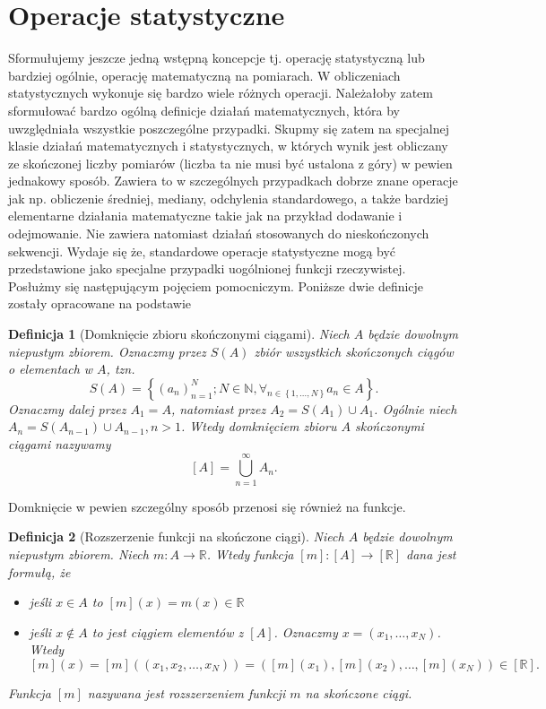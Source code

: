 \documentclass[12pt,a4paper]{report}
\newtheorem{definition}{Definicja}[chapter]
\newcommand{\zbior}[1]{\left\lbrace {#1} \right\rbrace }
\newcommand{\domkniecie}[1]{\left[ {#1} \right] }
\begin{document}
\section{Operacje statystyczne}
 Sformułujemy jeszcze jedną wstępną koncepcje tj. operację statystyczną lub bardziej ogólnie, operację matematyczną na pomiarach. W obliczeniach statystycznych wykonuje się bardzo wiele różnych operacji. Należałoby zatem sformułować bardzo ogólną definicje działań matematycznych, która by uwzględniała wszystkie poszczególne przypadki. Skupmy się zatem na specjalnej klasie działań matematycznych i statystycznych, w których wynik jest obliczany ze skończonej liczby pomiarów (liczba ta nie musi być ustalona z góry) w pewien jednakowy sposób. Zawiera to w szczególnych przypadkach dobrze znane operacje jak np. obliczenie średniej, mediany, odchylenia standardowego, a także bardziej elementarne działania matematyczne takie jak na przykład dodawanie i odejmowanie. Nie zawiera natomiast działań stosowanych do nieskończonych sekwencji. Wydaje się że, standardowe operacje statystyczne mogą być przedstawione jako specjalne przypadki uogólnionej funkcji rzeczywistej. Posłużmy się następującym pojęciem pomocniczym. 
Poniższe dwie definicje zostały opracowane na podstawie {\cite[Sec. 4]{adams1965theory}}
\begin{definition}[Domknięcie zbioru skończonymi ciągami]
Niech $A$ będzie dowolnym niepustym zbiorem. Oznaczmy przez $S(A)$ zbiór wszystkich skończonych ciągów o elementach w $A$, tzn.
$$
S(A)=\zbior{(a_n)^{N}_{n=1}; N\in \mathbb{N}, \forall_{n\in \zbior{1,\dots,N}} a_n \in A}.
$$
Oznaczmy dalej przez $A_1 =A$, natomiast przez $A_2 = S(A_1) \cup A_1$. Ogólnie niech $A_n = S(A_{n-1})\cup A_{n-1}, n>1$. Wtedy domknięciem zbioru $A$ skończonymi ciągami nazywamy
$$
\domkniecie{A}=\bigcup^{\infty}_{n=1} A_n.
$$ 
\end{definition}
Domknięcie w pewien szczególny sposób przenosi się również na funkcje.
\begin{definition}[Rozszerzenie funkcji na skończone ciągi]
Niech $A$ będzie dowolnym niepustym zbiorem. Niech $m:A\to \mathbb{R}$. Wtedy funkcja $\domkniecie{m}:\domkniecie{A}\to \domkniecie{\mathbb{R}}$ dana jest formułą, że
\begin{itemize}
\item jeśli $x\in A$ to $\domkniecie{m}(x) =m(x) \in \mathbb{R}$
\item jeśli $x\notin A$ to jest ciągiem elementów z $\domkniecie{A}$. Oznaczmy $x=(x_1,\dots,x_N)$. Wtedy 
$$
\domkniecie{m}(x)=\domkniecie{m}((x_1,x_2,\dots,x_N))=(\domkniecie{m}(x_1),\domkniecie{m}(x_2),\dots, \domkniecie{m}(x_N))\in \domkniecie{\mathbb{R}}.
$$
\end{itemize}
Funkcja $\domkniecie{m}$ nazywana jest rozszerzeniem funkcji $m$ na skończone ciągi.
\end{definition}
\end{document}
